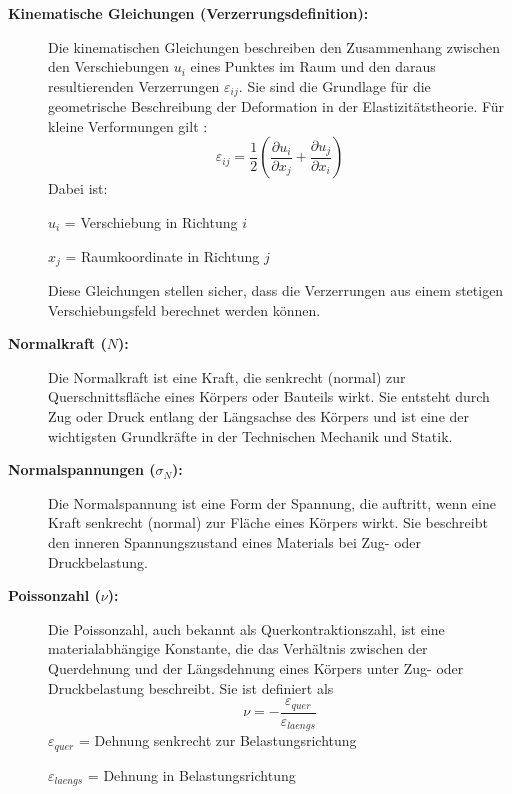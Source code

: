 \begin{description}
	\item[\textbf{Kinematische Gleichungen (Verzerrungsdefinition):}] Die kinematischen Gleichungen beschreiben den Zusammenhang zwischen den Verschiebungen $u_i$ eines Punktes im Raum und den daraus resultierenden Verzerrungen $\varepsilon_{ij}$. 
	Sie sind die Grundlage für die geometrische Beschreibung der Deformation in der Elastizitätstheorie. 
	Für kleine Verformungen gilt \cite{elastomechanik:Technische Mechanik 2:Elastostatik}:
	\begin{equation}
		\varepsilon_{ij} = 
		\frac{1}{2} \left( \frac{\partial u_i}{\partial x_j} + \frac{\partial u_j}{\partial x_i} \right)
	\end{equation}
	Dabei ist:
	
		$u_i$ = Verschiebung in Richtung $i$
		
		$x_j$ = Raumkoordinate in Richtung $j$
		
	Diese Gleichungen stellen sicher, dass die Verzerrungen aus einem stetigen Verschiebungsfeld berechnet werden können.
	
	\item[\textbf{Normalkraft ($N$):}] Die Normalkraft ist eine Kraft, die senkrecht (normal) zur Querschnittsfläche eines Körpers oder Bauteils wirkt. 
	Sie entsteht durch Zug oder Druck entlang der Längsachse des Körpers und ist eine der wichtigsten Grundkräfte in der Technischen Mechanik und Statik.
	
	\item[\textbf{Normalspannungen ($\sigma_N$):}] Die Normalspannung ist eine Form der Spannung, die auftritt, wenn eine Kraft senkrecht (normal) zur Fläche eines Körpers wirkt. 
	Sie beschreibt den inneren Spannungszustand eines Materials bei Zug- oder Druckbelastung.
	
	\item[\textbf{Poissonzahl ($\nu$):}] Die Poissonzahl, auch bekannt als Querkontraktionszahl, ist eine materialabhängige Konstante, die das Verhältnis zwischen der Querdehnung und der Längsdehnung eines Körpers unter Zug- oder Druckbelastung beschreibt.
	Sie ist definiert als
	\begin{equation}
		\nu=
		-\frac{\varepsilon_{quer}}{\varepsilon_{laengs}}
	\end{equation}
	$\varepsilon_{quer}$ = Dehnung senkrecht zur Belastungsrichtung
	
	$\varepsilon_{laengs}$ = Dehnung in Belastungsrichtung
	

\end{description}
